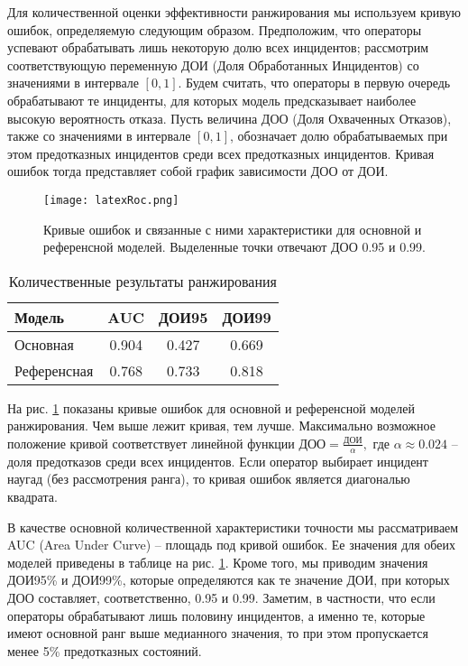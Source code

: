 Для количественной оценки эффективности ранжирования мы используем кривую ошибок, определяемую следующим образом. Предположим, что операторы успевают обрабатывать лишь некоторую долю всех инцидентов; рассмотрим соответствующую переменную ДОИ (Доля Обработанных Инцидентов) со значениями в интервале $[0,1]$. Будем считать, что операторы в первую очередь обрабатывают те инциденты, для которых модель предсказывает наиболее высокую вероятность отказа. Пусть величина ДОО (Доля Охваченных Отказов), также со значениями в интервале $[0,1]$, обозначает долю обрабатываемых при этом предотказных инцидентов среди всех предотказных инцидентов. Кривая ошибок тогда представляет собой график зависимости ДОО от ДОИ.

\begin{figure}[thb]
\centering
\texttt{[image: latexRoc.png]}
\caption{Кривые ошибок и связанные с ними характеристики для основной и референсной моделей. Выделенные точки отвечают ДОО 0.95 и  0.99.}\label{fig:ROCcurves}
\end{figure}

\begin{table} [htbp]
  \label{tbl:aucresults}
  \centering
  \caption{Количественные результаты ранжирования}\label{Ts0Sib}%
\begin{tabular}{ l c c c}
\toprule
Модель & AUC & ДОИ95 & ДОИ99 \\ \midrule
Основная & 0.904& 0.427 & 0.669 \\
Референсная & 0.768 & 0.733 & 0.818\\
\bottomrule
\end{tabular}
\end{table}

На рис. \ref{fig:ROCcurves} показаны кривые ошибок для основной и референсной моделей ранжирования. Чем выше лежит кривая, тем лучше. Максимально возможное положение кривой соответствует линейной функции $\text{ДОО}=\frac{ДОИ}{\alpha},$ где $\alpha\approx 0.024$ -- доля предотказов среди всех инцидентов. Если оператор выбирает инцидент наугад (без рассмотрения ранга), то кривая ошибок является диагональю квадрата.

В качестве основной количественной характеристики точности мы рассматриваем AUC (Area Under Curve) -- площадь под кривой ошибок. Ее значения для обеих моделей приведены в таблице на рис. \ref{fig:ROCcurves}. Кроме того, мы приводим значения ДОИ95\% и ДОИ99\%, которые определяются как те значение ДОИ, при которых ДОО составляет, соответственно, 0.95 и 0.99. Заметим, в частности, что если операторы обрабатывают лишь половину инцидентов, а именно те, которые имеют основной ранг выше медианного значения, то при этом пропускается менее 5\% предотказных состояний.


